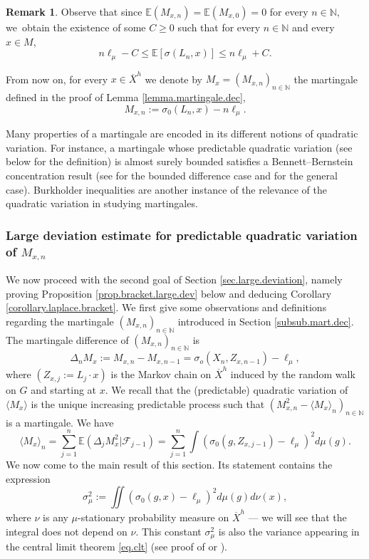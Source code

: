 \documentclass[10pt]{amsart}
\theoremstyle{plain}
\theoremstyle{definition}
\newtheorem{remark}[theorem]{Remark}
\newcommand\E{\mathbb{E}}
\newcommand\N{\mathbb{N}}
\begin{document}
\begin{remark}\label{remark.martingale}
Observe that since $\E(M_{x,n})=\E(M_{x,0})=0$ for every $n\in \N$, we~obtain the existence of some $C\geq 0$ such that for every $n\in \N$ and every $x\in M$,
\[
n\ell_\mu - C \leq \E[\sigma(L_n, x)] \leq n \ell_\mu+C.
\]
\end{remark}

From now on, for every $x\in \overline{X}^h$ we denote by $M_x=(M_{x,n})_{n\in \N}$ the martingale defined in the proof of Lemma \ref{lemma.martingale.dec}, \ie
\[
M_{x,n}:=\sigma_0(L_n, x)-n\ell_{\mu}.
\]

Many properties of a martingale are encoded in its different notions of quadratic variation. For instance, a martingale whose predictable quadratic variation (see below for the definition) is almost surely bounded satisfies a Bennett--Bernstein concentration result (see \cite{Freedman} for the bounded difference case and \cite{pena,DZ,fan.grama.liu} for the general case). Burkholder inequalities \cite{burkholder} are another instance of the relevance of the quadratic variation in studying martingales.

\subsubsection{Large deviation estimate for predictable quadratic variation of $M_{x,n}$} \label{subsub.bracket.large.dev}
We now proceed with the second goal of Section \ref{sec.large.deviation}, namely proving Proposition \ref{prop.bracket.large.dev} below and deducing Corollary \ref{corollary.laplace.bracket}. We first give some observations and definitions regarding the martingale $(M_{x,n})_{n\in \N}$ introduced in Section \ref{subsub.mart.dec}. The martingale difference of $(M_{x,n})_{n\in \N}$ is
\begin{equation}\label{our.martingale.difference}\Delta_n M_x:=M_{x,n}-M_{x,n-1}=\sigma_o(X_n, Z_{x,n-1})-\ell_\mu,\end{equation}
where $(Z_{x,j}:=L_j\cdot x)$ is the Markov chain on $\overline{X}^h$ induced by the random walk on $G$ and starting at $x$.
We recall that the (predictable) quadratic variation of $\langle M_x\rangle$ is the unique increasing predictable process such that $(M_{x,n}^2-\langle M_x \rangle_n)_{n\in \N}$ is a martingale. We have
\begin{equation}\label{bracket.expression}\langle M_x\rangle_n=
\sum_{j=1}^n{\E(\Delta_j M_{x}^2 | \mathcal{F}_{j-1})}=
\sum_{j=1}^n{\int{(\sigma_0(g,Z_{x,j-1}) -\ell_{\mu})^2 d\mu(g)}}.\end{equation}
We now come to the main result of this section. Its statement contains the expression
\begin{equation}\label{eq.exp.variance}
\sigma_{\mu}^2:=\iint{(\sigma_0(g,x)-\ell_{\mu})^2 d\mu(g) d\nu(x)},
\end{equation}
where $\nu$ is any $\mu$-stationary probability measure on $\overline{X}^h$ --- we will see that the integral does not depend on $\nu$. This constant $\sigma_\mu^2$ is also the variance appearing in the central limit theorem \eqref{eq.clt} (see proof of \cite[Th.\,4.7.b]{BQ.hyperbolic} or \cite[Th.\,1.3]{horbez}).
\end{document}

